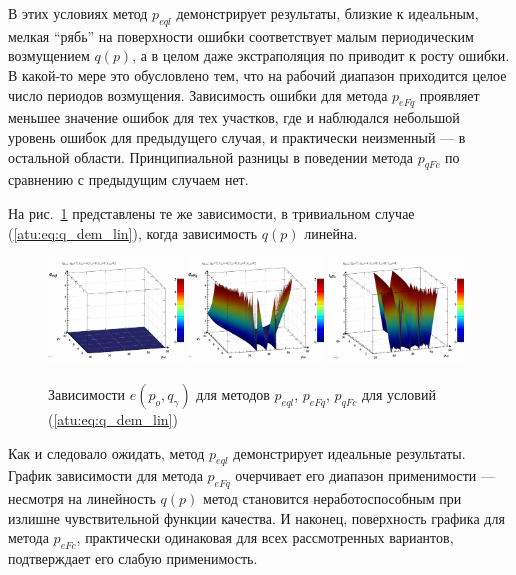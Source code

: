 В этих условиях метод $p_{eql}$ демонстрирует результаты, близкие к идеальным,
мелкая ``рябь'' на поверхности ошибки соответствует малым периодическим
возмущением $q(p)$, а в целом даже экстраполяция по приводит к росту ошибки.
В какой-то мере это обусловлено тем, что на рабочий диапазон приходится целое
число периодов возмущения. Зависимость ошибки для метода
$p_{eFq}$ проявляет меньшее значение ошибок для
тех участков, где и наблюдался небольшой уровень ошибок для
предыдущего случая, и практически неизменный --- в остальной области.
Принципиальной разницы в поведении метода $p_{qFc}$
по сравнению с предыдущим случаем нет.

На рис.~\ref{atu:f:qsl_pe_po_qg_lin} представлены те же зависимости,
в тривиальном случае (\ref{atu:eq:q_dem_lin}),
когда зависимость $q(p)$ линейна.

\begin{figure}[htb!]
  \centerline{
    \includegraphics[width=0.32\textwidth]{p/qls_pe-p_po_qg_eql_lin.png}
    \hfill
    \includegraphics[width=0.32\textwidth]{p/qls_pe-p_po_qg_eFq_lin.png}
    \hfill
    \includegraphics[width=0.32\textwidth]{p/qls_pe-p_po_qg_eFc_lin.png}
  }
  \caption{Зависимости $e(p_o,q_\gamma)$ для методов $p_{eql}$, $p_{eFq}$, $p_{qFc}$ для условий (\ref{atu:eq:q_dem_lin})}
  \label{atu:f:qsl_pe_po_qg_lin}
\end{figure}

Как и следовало ожидать, метод $p_{eql}$
демонстрирует идеальные результаты.
График зависимости для метода $p_{eFq}$
очерчивает его диапазон применимости --- несмотря
на линейность $q(p)$ метод становится неработоспособным при
излишне чувствительной функции качества.
И наконец, поверхность графика для метода $p_{eFc}$,
практически одинаковая для всех рассмотренных вариантов,
подтверждает его слабую применимость.



